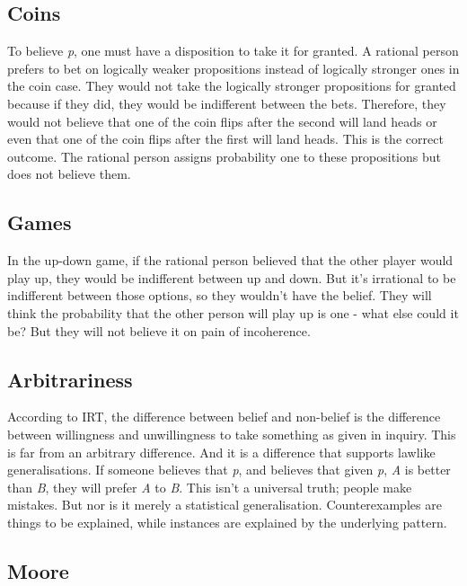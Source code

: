 \documentclass[
  12pt,
  letterpaper,
]{scrbook}
\begin{document}
\subsection{Coins}\label{coins}

To believe \emph{p}, one must have a disposition to take it for granted.
A rational person prefers to bet on logically weaker propositions
instead of logically stronger ones in the coin case. They would not take
the logically stronger propositions for granted because if they did,
they would be indifferent between the bets. Therefore, they would not
believe that one of the coin flips after the second will land heads or
even that one of the coin flips after the first will land heads. This is
the correct outcome. The rational person assigns probability one to
these propositions but does not believe them.

\subsection{Games}\label{games}

In the up-down game, if the rational person believed that the other
player would play up, they would be indifferent between up and down. But
it's irrational to be indifferent between those options, so they
wouldn't have the belief. They will think the probability that the other
person will play up is one - what else could it be? But they will not
believe it on pain of incoherence.

\subsection{Arbitrariness}\label{arbitrariness}

According to IRT, the difference between belief and non-belief is the
difference between willingness and unwillingness to take something as
given in inquiry. This is far from an arbitrary difference. And it is a
difference that supports lawlike generalisations. If someone believes
that \emph{p}, and believes that given \emph{p}, \emph{A} is better than
\emph{B}, they will prefer \emph{A} to \emph{B}. This isn't a universal
truth; people make mistakes. But nor is it merely a statistical
generalisation. Counterexamples are things to be explained, while
instances are explained by the underlying pattern.

\subsection{Moore}\label{moore}
\end{document}
